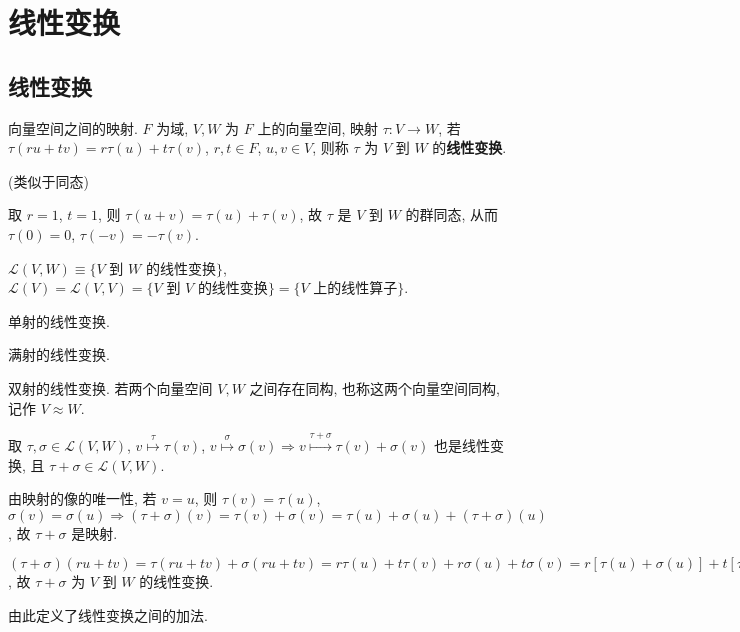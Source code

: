 \documentclass{note}
\begin{document}
\fi
\chapter{线性变换}
\section{线性变换}
\begin{df}[线性变换]
    向量空间之间的映射. $F$ 为域, $V,W$ 为 $F$ 上的向量空间, 映射 $\tau:V\rightarrow W$, 若 $\tau(ru+tv)=r\tau(u)+t\tau(v)$, $r,t\in F$, $u,v\in V$, 则称 $\tau$ 为 $V$ 到 $W$ 的\textbf{线性变换}.
\end{df}
(类似于同态)

取 $r=1$, $t=1$, 则 $\tau(u+v)=\tau(u)+\tau(v)$, 故 $\tau$ 是 $V$ 到 $W$ 的群同态, 从而 $\tau(0)=0$, $\tau(-v)=-\tau(v)$.

$\mathcal{L}(V,W)\equiv\{\text{$V$ 到 $W$ 的线性变换}\}$, $\mathcal{L}(V)=\mathcal{L}(V,V)=\{\text{$V$ 到 $V$ 的线性变换}\}=\{\text{$V$ 上的线性算子}\}$.

\begin{df}[单线性变换]
    单射的线性变换.
\end{df}

\begin{df}[满线性变换]
    满射的线性变换.
\end{df}

\begin{df}[同构]
    双射的线性变换. 若两个向量空间 $V,W$ 之间存在同构, 也称这两个向量空间同构, 记作 $V\approx W$.
\end{df}

取 $\tau,\sigma\in\mathcal{L}(V,W)$, $v\overset{\tau}{\mapsto}\tau(v)$, $v\overset{\sigma}{\mapsto}\sigma(v)\Longrightarrow v\overset{\tau+\sigma}{\mapsto}\tau(v)+\sigma(v)$ 也是线性变换, 且 $\tau+\sigma\in\mathcal{L}(V,W)$.
\begin{pf}
    由映射的像的唯一性, 若 $v=u$, 则 $\tau(v)=\tau(u)$, $\sigma(v)=\sigma(u)\Longrightarrow(\tau+\sigma)(v)=\tau(v)+\sigma(v)=\tau(u)+\sigma(u)+(\tau+\sigma)(u)$, 故 $\tau+\sigma$ 是映射.

    $(\tau+\sigma)(ru+tv)=\tau(ru+tv)+\sigma(ru+tv)=r\tau(u)+t\tau(v)+r\sigma(u)+t\sigma(v)=r[\tau(u)+\sigma(u)]+t[\tau(v)+\sigma(v)]=r[(\tau+\sigma)(u)]+t[(\tau+\sigma)(v)]$, 故 $\tau+\sigma$ 为 $V$ 到 $W$ 的线性变换.
\end{pf}
由此定义了线性变换之间的加法.
\end{document}
